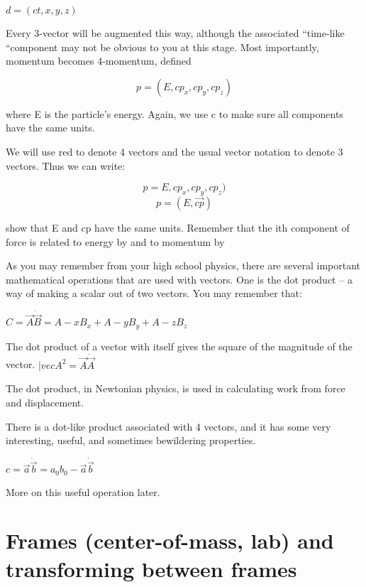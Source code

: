 	 \center  $d=(ct,x,y,z)$

Every 3-vector will be augmented this way, although the associated “time-like “component may not be obvious to you at this stage.  Most importantly, momentum becomes 4-momentum, defined

	  \begin{equation}  p=(E,cp_x, cp_y, cp_z)  \end{equation}

where E is the particle’s energy. Again, we use c to make sure all components have the same units.
	 
We will use red to denote 4 vectors and the usual vector notation to denote 3 vectors.  Thus we can write:

	   \begin{equation} p=E,cp_x, cp_y, cp_z)  \end{equation}  	
	   \begin{equation} p=(E,\vec{cp})  \end{equation} 	
 

\begin{example}[Example 1]
show that E and cp have the same units.
Remember that the ith component of force is related to energy by  and to momentum by  
\end{example}
 

As you may remember from your high school physics, there are several important mathematical operations that are used with vectors.  One is the dot product – a way of making a scalar out of two vectors.  You may remember that:

                                        \center $C=\vec A \dot \vec B = A-xB_x +A-yB_y +A-zB_z $

The dot product of a vector with itself gives the square of the magnitude of the vector.
      \center $| vec{A^2} =\vec A \dot \vec A  $
	  
The dot product, in Newtonian physics, is used in calculating work from force and displacement.

There is a dot-like product associated with 4 vectors, and it has some very interesting, useful, and sometimes bewildering properties.

	    \center  $c = \vec a \dot \vec b = a_0b_0 - \vec a \dot \vec b$

More on this useful operation later.

\section{Frames (center-of-mass, lab) and transforming between frames}

